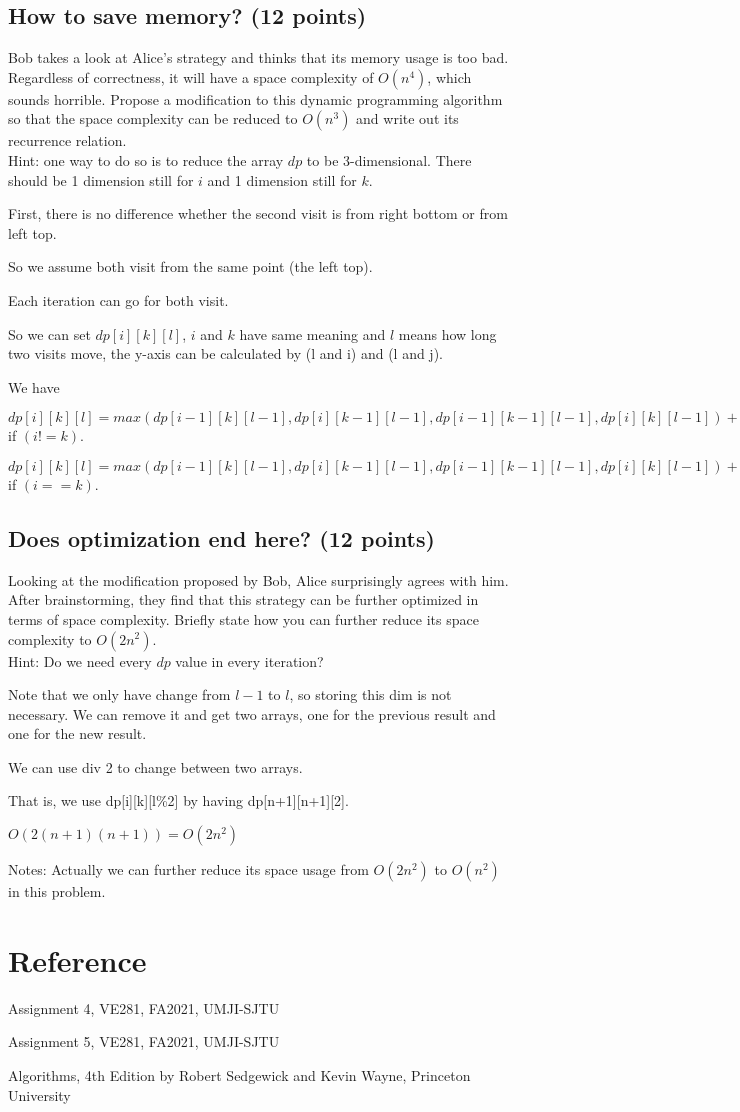 \documentclass[11pt]{exam}
\begin{document}
\subsection{How to save memory? (12 points)}
Bob takes a look at Alice's strategy and thinks that its memory usage is too bad. Regardless of correctness, it will have a space complexity of $O(n^4)$, which sounds horrible. Propose a modification to this dynamic programming algorithm so that the space complexity can be reduced to $O(n^3)$ and write out its recurrence relation.\\
Hint: one way to do so is to reduce the array $dp$ to be 3-dimensional. There should be 1 dimension still for $i$ and 1 dimension still for $k$.
\begin{solution}
    First, there is no difference whether the second visit is from right bottom or from left top.

    So we assume both visit from the same point (the left top).

    Each iteration can go for both visit.

    So we can set $dp[i][k][l]$, $i$ and $k$ have same meaning and $l$ means how long two visits move, the y-axis can be calculated by (l and i) and (l and j).

    We have

    $dp[i][k][l] = max (dp[i-1][k][l-1],dp[i][k-1][l-1],dp[i-1][k-1][l-1],dp[i][k][l-1]) + integers[i][l+2-i] + integers[k][l+2-k] $ if $(i!=k)$.

    $dp[i][k][l] = max (dp[i-1][k][l-1],dp[i][k-1][l-1],dp[i-1][k-1][l-1],dp[i][k][l-1]) + integers[i][l+2-i]  $ if $(i==k)$.
\end{solution}
\subsection{Does optimization end here? (12 points)}
Looking at the modification proposed by Bob, Alice surprisingly agrees with him. After brainstorming, they find that this strategy can be further optimized in terms of space complexity. Briefly state how you can further reduce its space complexity to $O(2n^2)$.\\
Hint: Do we need every $dp$ value in every iteration?
\begin{solution}

    Note that we only have change from $l-1$ to $l$, so storing this dim is not necessary.
    We can remove it and get two arrays, one for the previous result and one for the new result.

    We can use div 2 to change between two arrays.

    That is, we use dp[i][k][l\%2] by having dp[n+1][n+1][2].

    $O(2(n+1) (n+1) )=O(2n^2)$

\end{solution}
Notes: Actually we can further reduce its space usage from $O(2n^2)$ to $O(n^2)$ in this problem.
\newpage

\section*{Reference}
Assignment 4, VE281, FA2021, UMJI-SJTU

Assignment 5, VE281, FA2021, UMJI-SJTU

Algorithms, 4th Edition by Robert Sedgewick and Kevin Wayne, Princeton University
\end{document}
